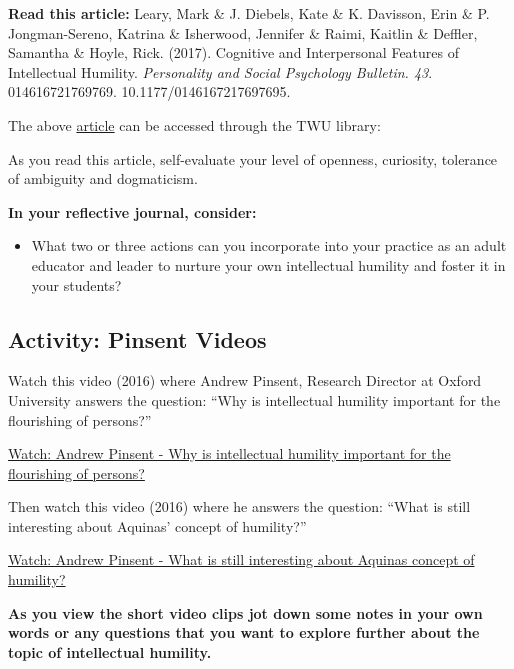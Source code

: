\documentclass[
]{book}
\providecommand{\tightlist}{%
  \setlength{\itemsep}{0pt}\setlength{\parskip}{0pt}}
\begin{document}
\begin{reflect}
\textbf{Read this article:} Leary, Mark \& J. Diebels, Kate \& K. Davisson, Erin \& P. Jongman-Sereno, Katrina \& Isherwood, Jennifer \& Raimi, Kaitlin \& Deffler, Samantha \& Hoyle, Rick. (2017). Cognitive and Interpersonal Features of Intellectual Humility. \emph{Personality and Social Psychology Bulletin. 43}. 014616721769769. 10.1177/0146167217697695.

The above \href{https://journals-sagepub-com.ezproxy.student.twu.ca/doi/pdf/10.1177/0146167217697695?}{article} can be accessed through the TWU
library:

As you read this article, self-evaluate your level of openness, curiosity, tolerance of ambiguity and dogmaticism.

\textbf{In your reflective journal, consider:}

\begin{itemize}
\tightlist
\item
  What two or three actions can you incorporate into your practice as an adult educator and leader to nurture your own intellectual humility and foster it in your students?
\end{itemize}
\end{reflect}

\hypertarget{activity-pinsent-videos}{%
\subsection*{Activity: Pinsent Videos}\label{activity-pinsent-videos}}

\begin{reflect}
Watch this video (2016) where Andrew Pinsent, Research Director at Oxford University answers the question: ``Why is intellectual humility important for the flourishing of persons?''

\href{https://www.youtube.com/watch?v=ny5m64sjm14}{Watch: Andrew Pinsent - Why is intellectual humility important for the flourishing of persons?}

Then watch this video (2016) where he answers the question: ``What is still interesting about Aquinas' concept of humility?''

\href{https://www.youtube.com/watch?v=j25KL5qw_tY}{Watch: Andrew Pinsent - What is still interesting about Aquinas concept of humility?}

\textbf{As you view the short video clips jot down some notes in your own words or any questions that you want to explore further about the topic of intellectual humility.}
\end{reflect}
\end{document}
